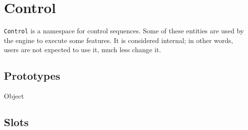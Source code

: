 
\section{Control}

\lstinline|Control| is a namespace for control sequences.  Some of these
entities are used by the \urbi engine to execute some \us features.  It is
considered internal; in other words, users are not expected to use it, much
less change it.

\subsection{Prototypes}

\begin{refObjects}
\item[Object]
\end{refObjects}

\subsection{Slots}

